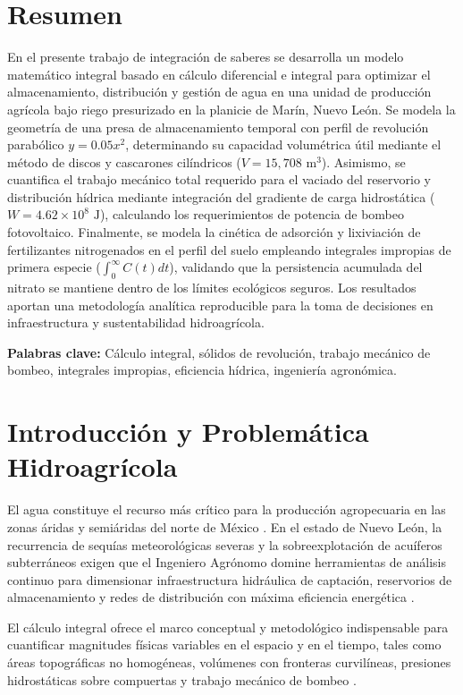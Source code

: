 \section*{Resumen}
En el presente trabajo de integración de saberes se desarrolla un modelo matemático integral basado en cálculo diferencial e integral para optimizar el almacenamiento, distribución y gestión de agua en una unidad de producción agrícola bajo riego presurizado en la planicie de Marín, Nuevo León. Se modela la geometría de una presa de almacenamiento temporal con perfil de revolución parabólico $y = 0.05 x^2$, determinando su capacidad volumétrica útil mediante el método de discos y cascarones cilíndricos ($V = 15,708\text{ m}^3$). Asimismo, se cuantifica el trabajo mecánico total requerido para el vaciado del reservorio y distribución hídrica mediante integración del gradiente de carga hidrostática ($W = 4.62 \times 10^8\text{ J}$), calculando los requerimientos de potencia de bombeo fotovoltaico. Finalmente, se modela la cinética de adsorción y lixiviación de fertilizantes nitrogenados en el perfil del suelo empleando integrales impropias de primera especie ($\int_0^\infty C(t)dt$), validando que la persistencia acumulada del nitrato se mantiene dentro de los límites ecológicos seguros. Los resultados aportan una metodología analítica reproducible para la toma de decisiones en infraestructura y sustentabilidad hidroagrícola.

\vspace{0.4cm}
\noindent\textbf{Palabras clave:} Cálculo integral, sólidos de revolución, trabajo mecánico de bombeo, integrales impropias, eficiencia hídrica, ingeniería agronómica.

\section{Introducción y Problemática Hidroagrícola}
El agua constituye el recurso más crítico para la producción agropecuaria en las zonas áridas y semiáridas del norte de México \parencite{larson2014}. En el estado de Nuevo León, la recurrencia de sequías meteorológicas severas y la sobreexplotación de acuíferos subterráneos exigen que el Ingeniero Agrónomo domine herramientas de análisis continuo para dimensionar infraestructura hidráulica de captación, reservorios de almacenamiento y redes de distribución con máxima eficiencia energética \parencite{conagua2019}.

El cálculo integral ofrece el marco conceptual y metodológico indispensable para cuantificar magnitudes físicas variables en el espacio y en el tiempo, tales como áreas topográficas no homogéneas, volúmenes con fronteras curvilíneas, presiones hidrostáticas sobre compuertas y trabajo mecánico de bombeo \parencite{stewart2016, thomas2015}.

